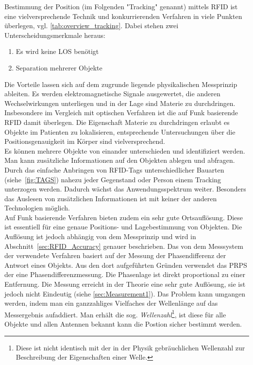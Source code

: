 Bestimmung der Position (im Folgenden "Tracking" genannt) mittels RFID ist eine vielversprechende Technik und konkurrierenden Verfahren in viele Punkten überlegen, vgl. \ref{tab:overview_tracking}. Dabei stehen zwei Unterscheidungsmerkmale heraus:
%
\begin{enumerate}
	\item Es wird keine LOS benötigt
	\item Separation mehrerer Objekte
\end{enumerate}
%
Die Vorteile lassen sich auf dem zugrunde liegende physikalischen Messprinzip ableiten. Es werden elektromagnetische Signale ausgewertet, die anderen Wechselwirkungen unterliegen und in der Lage sind Materie zu durchdringen. Insbesondere im Vergleich mit optischen Verfahren ist die auf Funk basierende RFID damit überlegen. Die Eigenschaft Materie zu durchdringen erlaubt es Objekte im Patienten zu lokalisieren, entsprechende Untersuchungen über die Positionsgenauigkeit im Körper sind vielversprechend.~\cite{Knipscheer1}\\

Es können mehrere Objekte von einander unterschieden und identifiziert werden. Man kann zusätzliche Informationen auf den Objekten ablegen und abfragen. Durch das einfache Anbringen von RFID-Tags unterschiedlicher Bauarten (siehe~\ref{fig:TAGS}) nahezu jeder Gegenstand oder Person einem Tracking unterzogen werden. Dadurch wächst das Anwendungsspektrum weiter. Besonders das Auslesen von zusätzlichen Informationen ist mit keiner der anderen Technologien möglich.\\

Auf Funk basierende Verfahren bieten zudem ein sehr gute Ortsauflösung. Diese ist essentiell für eine genaue Positions- und Lagebestimmung von Objekten. Die Auflösung ist jedoch abhängig von dem Messprinzip und wird in Abschnitt~\ref{sec:RFID_Accuracy} genauer beschrieben. 
Das von dem Messsystem der \amedogmbh verwendete Verfahren basiert auf der Messung der Phasendifferenz der Antwort eines Objekts. Aus den dort aufgeführten Gründen verwendet das PRPS der \amedogmbh eine Phasendifferenzmessung. Die Phasenlage ist direkt proportional zu einer Entfernung. Die Messung erreicht in der Theorie eine sehr gute Auflösung, sie ist jedoch nicht Eindeutig (siehe \ref{sec:Measurement1}). Das Problem kann umgangen werden, indem man ein ganzzahliges Vielfaches der Wellenlänge auf das Messergebnis aufaddiert. Man erhält die sog. \textit{Wellenzahl}\footnote{Diese ist nicht identisch mit der in der Physik gebräuchlichen Wellenzahl zur Beschreibung der Eigenschaften einer Welle.}, ist diese für alle Objekte und allen Antennen bekannt kann die Postion sicher bestimmt werden.\\

